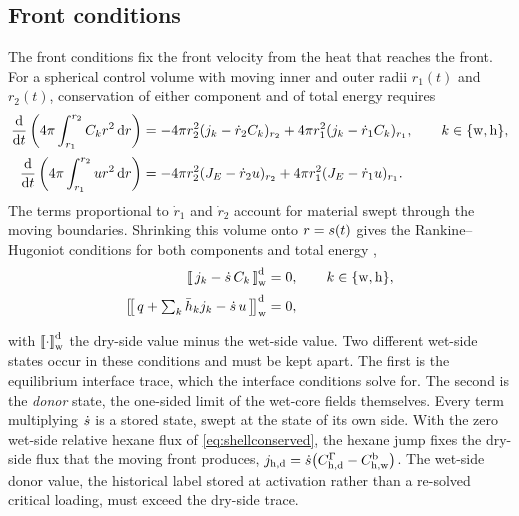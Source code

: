 \begin{samepage}
\subsection{Front conditions}
\label{sec:model:front}

The front conditions fix the front velocity from the heat that reaches the
front. For a spherical control volume with moving inner and outer radii
$r_1(t)$ and $r_2(t)$, conservation of either component and of total energy
requires
\begin{align}
\frac{\mathrm{d}}{\mathrm{d} t}\left(4\pi\int_{r_1}^{r_2} C_k r^2\,\mathrm{d} r\right)
 &=-4\pi r_2^2(j_k-\dot r_2 C_k)_{r_2}
   +4\pi r_1^2(j_k-\dot r_1 C_k)_{r_1},
 \qquad k\in\{\mathrm{w},\mathrm{h}\},
\label{eq:movingcomp}\\[2pt]
\frac{\mathrm{d}}{\mathrm{d} t}\left(4\pi\int_{r_1}^{r_2} u r^2\,\mathrm{d} r\right)
 &=-4\pi r_2^2(J_{E}-\dot r_2 u)_{r_2}
   +4\pi r_1^2(J_{E}-\dot r_1 u)_{r_1}.
\label{eq:movingenergy}
\end{align}
The terms proportional to $\dot r_1$ and $\dot r_2$ account for material
swept through the moving boundaries. Shrinking this volume onto
$r=s(t)$ gives the Rankine--Hugoniot conditions for both components
and total energy \citep{crank1984free},
\begin{align}
\left[\!\left[ \,j_{k} - \dot{s}\,C_{k}\, \right]\!\right]_{\mathrm{w}}^{\mathrm{d}} &= 0,
\qquad k \in \{\mathrm{w},\mathrm{h}\},
\label{eq:rhcomp}\\[2pt]
\left[\!\left[ \,q + \textstyle\sum_{k} \bar{h}_{k} j_{k} - \dot{s}\,u\, \right]\!\right]_{\mathrm{w}}^{\mathrm{d}} &= 0 ,
\label{eq:rhenergy}
\end{align}
\end{samepage}
with $\left[\!\left[ \cdot \right]\!\right]_{\mathrm{w}}^{\mathrm{d}}$ the dry-side value minus the
wet-side value. Two different wet-side states occur in
these conditions and must be kept apart. The first is the equilibrium
interface trace, which the interface conditions solve for. The second is the
\emph{donor} state, the one-sided limit of the wet-core fields themselves.
Every term multiplying $\dot{s}$ is a stored state, swept at the state
of its own side. With the zero
wet-side relative hexane flux of \eqref{eq:shellconserved}, the hexane jump
fixes the dry-side flux that the moving front produces,
\(j_{\mathrm{h,d}}=\dot{s}\bigl(C_{\mathrm{h,d}}^{\Gamma}-C_{\mathrm{h,w}}^{\mathrm{b}}\bigr)\).
The wet-side donor value, the historical label stored at activation rather
than a re-solved critical loading, must exceed the dry-side trace.
